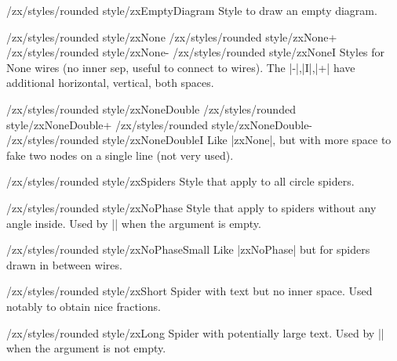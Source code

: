 \documentclass[a4paper]{ltxdoc}
\begin{document}
\begin{stylekey}{/zx/styles/rounded style/zxEmptyDiagram}
  Style to draw an empty diagram.
\end{stylekey}

\begin{pgfmanualentry}
  \makeatletter
  \def\extrakeytext{style, }
  \extractkey/zx/styles/rounded style/zxNone\@nil%
  \extractkey/zx/styles/rounded style/zxNone+\@nil%
  \extractkey/zx/styles/rounded style/zxNone-\@nil%
  \extractkey/zx/styles/rounded style/zxNoneI\@nil%
  \makeatother
  \pgfmanualbody
  Styles for None wires (no inner sep, useful to connect to wires). The |-|,|I|,|+| have additional horizontal, vertical, both spaces.
\end{pgfmanualentry}

\begin{pgfmanualentry}
  \makeatletter
  \def\extrakeytext{style, }
  \extractkey/zx/styles/rounded style/zxNoneDouble\@nil%
  \extractkey/zx/styles/rounded style/zxNoneDouble+\@nil%
  \extractkey/zx/styles/rounded style/zxNoneDouble-\@nil%
  \extractkey/zx/styles/rounded style/zxNoneDoubleI\@nil%
  \makeatother
  \pgfmanualbody
  Like |zxNone|, but with more space to fake two nodes on a single line (not very used).
\end{pgfmanualentry}

\begin{stylekey}{/zx/styles/rounded style/zxSpiders}
  Style that apply to all circle spiders.
\end{stylekey}

\begin{stylekey}{/zx/styles/rounded style/zxNoPhase}
  Style that apply to spiders without any angle inside. Used by |\zxX{}| when the argument is empty.
\end{stylekey}

\begin{stylekey}{/zx/styles/rounded style/zxNoPhaseSmall}
  Like |zxNoPhase| but for spiders drawn in between wires.
\end{stylekey}

\begin{stylekey}{/zx/styles/rounded style/zxShort}
  Spider with text but no inner space. Used notably to obtain nice fractions.
\end{stylekey}

\begin{stylekey}{/zx/styles/rounded style/zxLong}
  Spider with potentially large text. Used by |\zxX{\alpha}| when the argument is not empty.
\end{stylekey}
\end{document}
